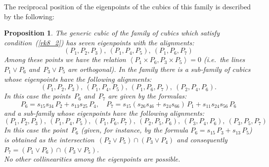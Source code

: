 \documentclass[a4paper, 11pt, reqno]{amsart}
\theoremstyle{plain}
\newtheorem{prop}[lemma]{Proposition}
\theoremstyle{definition}
\newcommand{\scl}[2]{\left\langle {#1}, {#2} \right\rangle}
\begin{document}
The reciprocal position of the eigenpoints of the cubics of this family
is described by the following:
%
\begin{prop}
\label{prop:rk8_2B}
The generic cubic of the family of cubics which satisfy condition~(\ref{rk8_2})
has seven eigenpoints with the alignments:
%
\[
  (P_1, P_2, P_3), \ (P_1, P_4, P_5), \ (P_1, P_6, P_7)
\]
%
Among these points we have the relation
$\scl{P_1 \times P_6}{P_3\times P_5}=0$
(i.e.\ the lines~$P_1 \vee P_6$ and~$P_3 \vee P_5$ are orthogonal).
In the family there is a sub-family of cubics whose eigenpoints have the following alignments:
%
\[
  (P_1, P_2, P_3),\ (P_1, P_4, P_5),\ (P_1, P_6, P_7),\ (P_2, P_4, P_6).
\]
%
In this case the points~$P_6$ and~$P_7$ are given by the formulas:
%
\begin{equation}
\label{formuleP6_P7}
P_6 =  s_{15}s_{34}\, P_2 + s_{13}s_{25}\, P_4, \quad 
P_7 = s_{15}(s_{26}s_{46}+s_{24}s_{66})\, P_1+ s_{11}s_{24}s_{56}\, P_6
\end{equation}
%
and a sub-family whose eigenpoints have the following
alignments:
%
\[
  (P_1, P_2, P_3),\ (P_1, P_4, P_5), \ 
  (P_1, P_6, P_7),\ (P_2, P_5, P_6), \ 
  (P_3, P_4, P_6),\ (P_3, P_5, P_7)
\]
%
In this case the point~$P_6$ (given, for instance, by the formula
$P_6 = s_{15} \, P_3 + s_{13} \, P_5$) is obtained as
the intersection~$(P_2 \vee P_5) \cap (P_3 \vee P_4)$ and consequently
$P_7 = (P_1 \vee P_6) \cap (P_3 \vee P_5)$.\\
No other collinearities among the eigenpoints are possible.
\end{prop}
%
\end{document}

